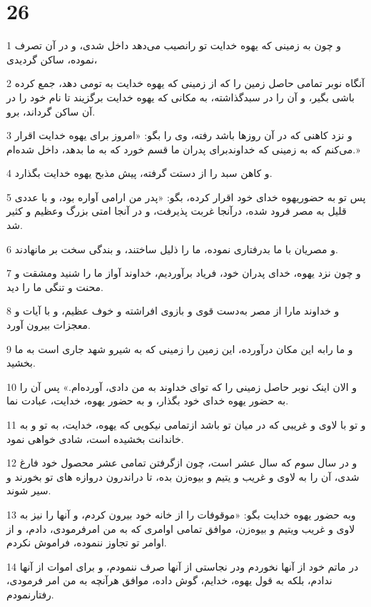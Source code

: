 \chapter{26}

\par 1 و چون به زمینی که یهوه خدایت تو رانصیب می‌دهد داخل شدی، و در آن تصرف نموده، ساکن گردیدی،
\par 2 آنگاه نوبر تمامی حاصل زمین را که از زمینی که یهوه خدایت به تومی دهد، جمع کرده باشی بگیر، و آن را در سبدگذاشته، به مکانی که یهوه خدایت برگزیند تا نام خود را در آن ساکن گرداند، برو.
\par 3 و نزد کاهنی که در آن روزها باشد رفته، وی را بگو: «امروز برای یهوه خدایت اقرار می‌کنم که به زمینی که خداوندبرای پدران ما قسم خورد که به ما بدهد، داخل شده‌ام.»
\par 4 و کاهن سبد را از دستت گرفته، پیش مذبح یهوه خدایت بگذارد.
\par 5 پس تو به حضوریهوه خدای خود اقرار کرده، بگو: «پدر من ارامی آواره بود، و با عددی قلیل به مصر فرود شده، درآنجا غربت پذیرفت، و در آنجا امتی بزرگ وعظیم و کثیر شد.
\par 6 و مصریان با ما بدرفتاری نموده، ما را ذلیل ساختند، و بندگی سخت بر مانهادند.
\par 7 و چون نزد یهوه، خدای پدران خود، فریاد برآوردیم، خداوند آواز ما را شنید ومشقت و محنت و تنگی ما را دید.
\par 8 و خداوند مارا از مصر به‌دست قوی و بازوی افراشته و خوف عظیم، و با آیات و معجزات بیرون آورد.
\par 9 و ما رابه این مکان درآورده، این زمین را زمینی که به شیرو شهد جاری است به ما بخشید.
\par 10 و الان اینک نوبر حاصل زمینی را که تو‌ای خداوند به من دادی، آورده‌ام.» پس آن را به حضور یهوه خدای خود بگذار، و به حضور یهوه، خدایت، عبادت نما.
\par 11 و تو با لاوی و غریبی که در میان تو باشد ازتمامی نیکویی که یهوه، خدایت، به تو و به خاندانت بخشیده است، شادی خواهی نمود.
\par 12 و در سال سوم که سال عشر است، چون ازگرفتن تمامی عشر محصول خود فارغ شدی، آن را به لاوی و غریب و یتیم و بیوه‌زن بده، تا دراندرون دروازه های تو بخورند و سیر شوند.
\par 13 وبه حضور یهوه خدایت بگو: «موقوفات را از خانه خود بیرون کردم، و آنها را نیز به لاوی و غریب ویتیم و بیوه‌زن، موافق تمامی اوامری که به من امرفرمودی، دادم، و از اوامر تو تجاوز ننموده، فراموش نکردم.
\par 14 در ماتم خود از آنها نخوردم ودر نجاستی از آنها صرف ننمودم، و برای اموات از آنها ندادم، بلکه به قول یهوه، خدایم، گوش داده، موافق هر‌آنچه به من امر فرمودی، رفتارنمودم.
